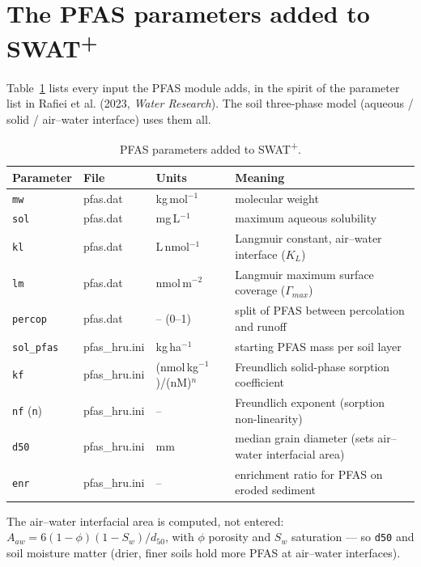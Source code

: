 \documentclass[12pt]{article}
\begin{document}
\section{The PFAS parameters added to SWAT\textsuperscript{+}}\label{g:params}
Table~\ref{g:partab} lists every input the PFAS module adds, in the spirit of the
parameter list in Rafiei et al. (2023, \emph{Water Research}). The soil
three-phase model (aqueous / solid / air--water interface) uses them all.
\begin{table}[ht]\centering\small
\caption{PFAS parameters added to SWAT\textsuperscript{+}.}\label{g:partab}
\begin{tabularx}{\textwidth}{llll}
\toprule
Parameter & File & Units & Meaning \\ \midrule
\texttt{mw}      & pfas.dat     & kg\,mol$^{-1}$ & molecular weight \\
\texttt{sol}     & pfas.dat     & mg\,L$^{-1}$ & maximum aqueous solubility \\
\texttt{kl}      & pfas.dat     & L\,nmol$^{-1}$ & Langmuir constant, air--water interface ($K_L$) \\
\texttt{lm}      & pfas.dat     & nmol\,m$^{-2}$ & Langmuir maximum surface coverage ($\Gamma_{max}$) \\
\texttt{percop}  & pfas.dat     & -- (0--1) & split of PFAS between percolation and runoff \\
\texttt{sol\_pfas} & pfas\_hru.ini & kg\,ha$^{-1}$ & starting PFAS mass per soil layer \\
\texttt{kf}      & pfas\_hru.ini & (nmol\,kg$^{-1}$)/(nM)$^n$ & Freundlich solid-phase sorption coefficient \\
\texttt{nf} (\texttt{n}) & pfas\_hru.ini & -- & Freundlich exponent (sorption non-linearity) \\
\texttt{d50}     & pfas\_hru.ini & mm & median grain diameter (sets air--water interfacial area) \\
\texttt{enr}     & pfas\_hru.ini & -- & enrichment ratio for PFAS on eroded sediment \\
\bottomrule
\end{tabularx}
\end{table}
The air--water interfacial area is computed, not entered:
$A_{aw}=6(1-\phi)(1-S_w)/d_{50}$, with $\phi$ porosity and $S_w$ saturation ---
so \texttt{d50} and soil moisture matter (drier, finer soils hold more PFAS at
air--water interfaces).

\end{document}
